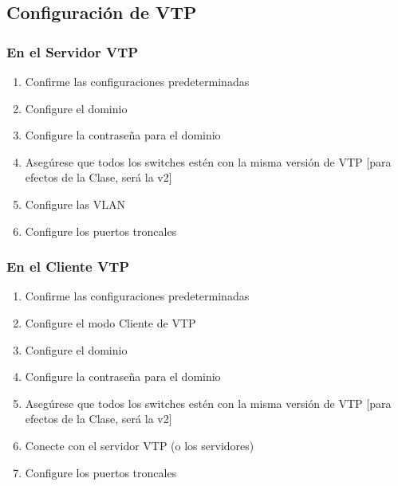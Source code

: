 \documentclass[12pt]{article}
\begin{document}
\subsection{Configuración de VTP}
\subsubsection{En el Servidor VTP}
\begin{enumerate}
    \item Confirme las configuraciones predeterminadas
    \item Configure el dominio
    \item Configure la contraseña para el dominio
    \item Asegúrese que todos los switches estén con la misma versión de VTP [para efectos de la Clase, será la v2]
    \item Configure las VLAN
    \item Configure los puertos troncales
\end{enumerate}

\subsubsection{En el Cliente VTP}
\begin{enumerate}
    \item Confirme las configuraciones predeterminadas
    \item Configure el modo Cliente de VTP
    \item Configure el dominio
    \item Configure la contraseña para el dominio
    \item Asegúrese que todos los switches estén con la misma versión de VTP [para efectos de la Clase, será la v2]
    \item Conecte con el servidor VTP (o los servidores)
    \item Configure los puertos troncales
\end{enumerate}



\end{document}
